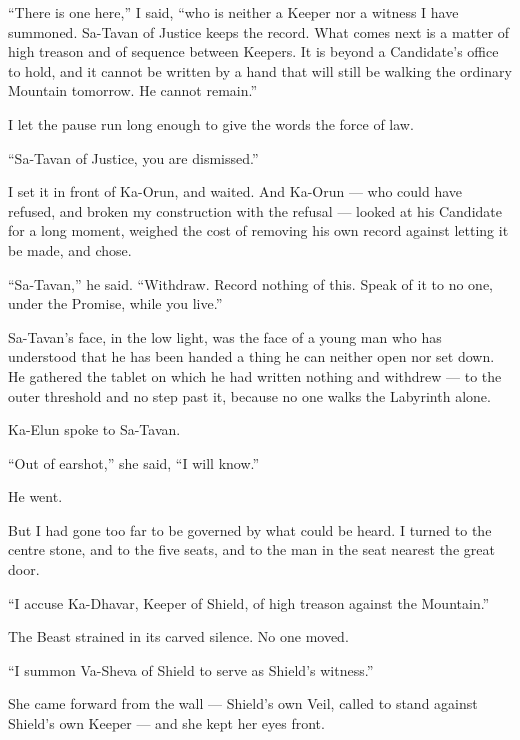 ``There is one here,'' I said, ``who is neither a Keeper nor a witness I have summoned. Sa-Tavan of Justice keeps the record. What comes next is a matter of high treason and of sequence between Keepers. It is beyond a Candidate's office to hold, and it cannot be written by a hand that will still be walking the ordinary Mountain tomorrow. He cannot remain.''\par

I let the pause run long enough to give the words the force of law.

``Sa-Tavan of Justice, you are dismissed.''

I set it in front of Ka-Orun, and waited. And Ka-Orun --- who could have refused, and broken my construction with the refusal --- looked at his Candidate for a long moment, weighed the cost of removing his own record against letting it be made, and chose.\par
 
``Sa-Tavan,'' he said. ``Withdraw. Record nothing of this. Speak of it to no one, under the Promise, while you live.''\par
 
Sa-Tavan's face, in the low light, was the face of a young man who has understood that he has been handed a thing he can neither open nor set down. He gathered the tablet on which he had written nothing and withdrew --- to the outer threshold and no step past it, because no one walks the Labyrinth alone.

Ka-Elun spoke to Sa-Tavan.\par
 
``Out of earshot,'' she said, ``I will know.''\par
 
He went.\par
 
But I had gone too far to be governed by what could be heard. I turned to the centre stone, and to the five seats, and to the man in the seat nearest the great door.\par
 
``I accuse Ka-Dhavar, Keeper of Shield, of high treason against the Mountain.''\par
 
The Beast strained in its carved silence. No one moved.\par
 
``I summon Va-Sheva of Shield to serve as Shield's witness.''\par
 
She came forward from the wall --- Shield's own Veil, called to stand against Shield's own Keeper --- and she kept her eyes front. \par
 
